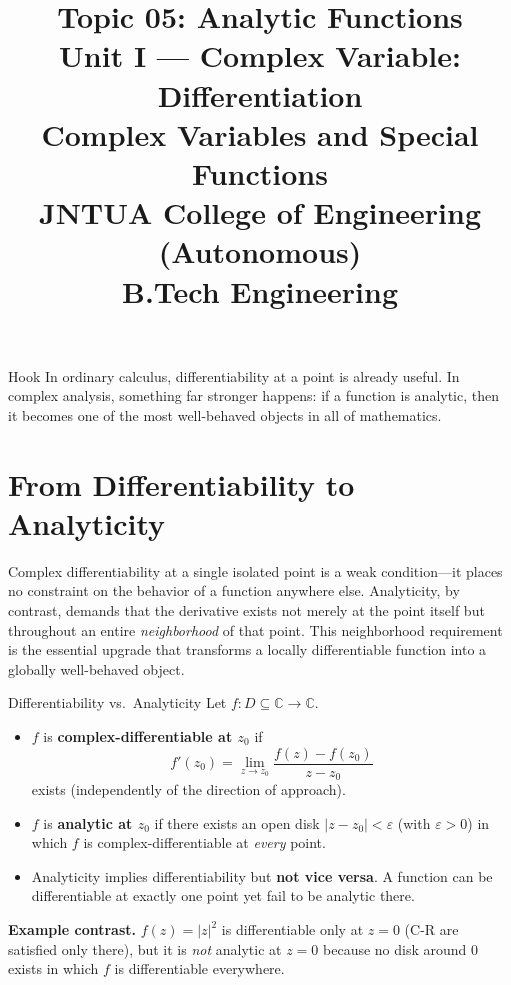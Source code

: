 \documentclass[12pt,a4paper]{article}
\title{\textbf{Topic 05: Analytic Functions}\\[6pt]
       \large Unit I --- Complex Variable: Differentiation\\[4pt]
       \normalsize Complex Variables and Special Functions\\
       JNTUA College of Engineering (Autonomous)\\
       B.Tech Engineering}
\date{}
\author{}
\begin{document}
\maketitle
\tableofcontents
\newpage

\begin{curiositybox}{Hook}
In ordinary calculus, differentiability at a point is already useful. In complex analysis, something far stronger happens: if a function is analytic, then it becomes one of the most well-behaved objects in all of mathematics.
\end{curiositybox}

\bigskip

\section{From Differentiability to Analyticity}

Complex differentiability at a single isolated point is a weak condition---it places no constraint on the behavior of a function anywhere else. Analyticity, by contrast, demands that the derivative exists not merely at the point itself but throughout an entire \emph{neighborhood} of that point. This neighborhood requirement is the essential upgrade that transforms a locally differentiable function into a globally well-behaved object.

\begin{infobox}{Differentiability vs.\ Analyticity}
Let $f : D \subseteq \mathbb{C} \to \mathbb{C}$.

\begin{itemize}
  \item $f$ is \textbf{complex-differentiable at $z_0$} if
        \[
          f'(z_0) = \lim_{z \to z_0} \frac{f(z)-f(z_0)}{z-z_0}
        \]
        exists (independently of the direction of approach).

  \item $f$ is \textbf{analytic at $z_0$} if there exists an open disk
        $|z - z_0| < \varepsilon$ (with $\varepsilon > 0$) in which $f$
        is complex-differentiable at \emph{every} point.

  \item Analyticity implies differentiability but \textbf{not vice versa}.
        A function can be differentiable at exactly one point yet fail to be
        analytic there.
\end{itemize}

\textbf{Example contrast.}
$f(z) = |z|^{2}$ is differentiable only at $z = 0$ (C-R are satisfied only there),
but it is \emph{not} analytic at $z = 0$ because no disk around $0$ exists in which
$f$ is differentiable everywhere.
\end{infobox}
\end{document}
